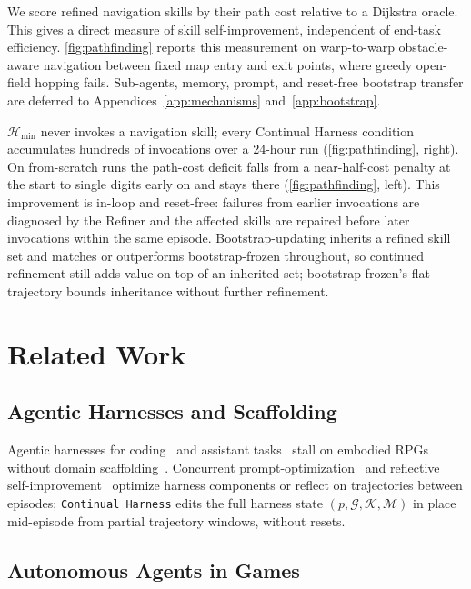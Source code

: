 \documentclass[11pt]{article}
\begin{document}
We score refined navigation skills by their path cost relative to a Dijkstra oracle. This gives a direct measure of skill self-improvement, independent of end-task efficiency. \cref{fig:pathfinding} reports this measurement on warp-to-warp obstacle-aware navigation between fixed map entry and exit points, where greedy open-field hopping fails. Sub-agents, memory, prompt, and reset-free bootstrap transfer are deferred to Appendices~\ref{app:mechanisms} and~\ref{app:bootstrap}.

$\mathcal{H}_{\min}$ never invokes a navigation skill; every Continual Harness condition accumulates hundreds of invocations over a 24-hour run (\cref{fig:pathfinding}, right). On from-scratch runs the path-cost deficit falls from a near-half-cost penalty at the start to single digits early on and stays there (\cref{fig:pathfinding}, left). This improvement is in-loop and reset-free: failures from earlier invocations are diagnosed by the Refiner and the affected skills are repaired before later invocations within the same episode. Bootstrap-updating inherits a refined skill set and matches or outperforms bootstrap-frozen throughout, so continued refinement still adds value on top of an inherited set; bootstrap-frozen's flat trajectory bounds inheritance without further refinement.


\section{Related Work}\label{sec:related_work}

\subsection{Agentic Harnesses and Scaffolding}

Agentic harnesses for coding~\citep{anthropic2025claudecode, wang2024openhands, steinberger2025openclaw} and assistant tasks~\citep{nousresearch2026hermes} stall on embodied RPGs without domain scaffolding~\citep{karten2026pokeagent}. Concurrent prompt-optimization~\citep{agrawal2025gepa, opsahl2024optimizing, lee2026meta} and reflective self-improvement~\citep{shinn2023reflexion, madaan2023self} optimize harness components or reflect on trajectories between episodes; \texttt{Continual Harness} edits the full harness state $(p, \mathcal{G}, \mathcal{K}, \mathcal{M})$ in place mid-episode from partial trajectory windows, without resets.

\subsection{Autonomous Agents in Games}
\end{document}

